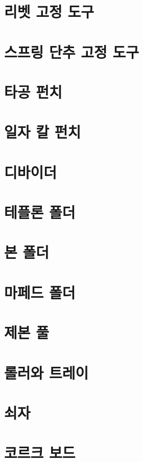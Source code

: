\documentclass[12pt, a4paper, oneside]{book}
\begin{document}
	\section{리벳 고정 도구}

	\section{스프링 단추 고정 도구}

	\section{타공 펀치}

	\section{일자 칼 펀치}

	\section{디바이더}


	\section{테플론 폴더}

	\section{본 폴더}

	\section{마페드 폴더}


	\section{제본 풀}

	\section{롤러와 트레이}

	\section{쇠자}

	\section{코르크 보드}
\end{document}
